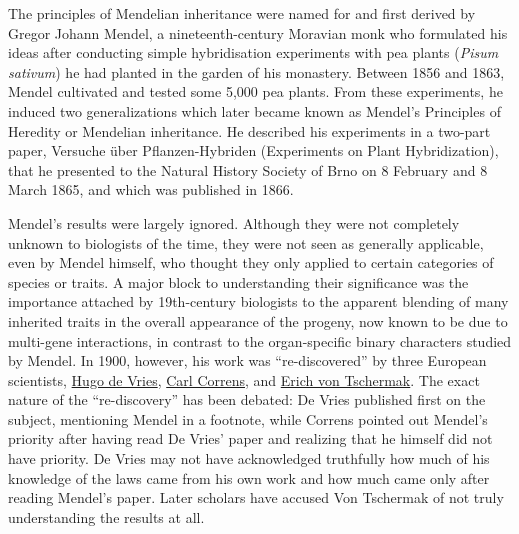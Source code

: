 The principles of Mendelian inheritance were named for and first derived by Gregor Johann Mendel, a nineteenth-century Moravian monk who formulated his ideas after conducting simple hybridisation experiments with pea plants (\emph{Pisum sativum}) he had planted in the garden of his monastery. Between 1856 and 1863, Mendel cultivated and tested some 5,000 pea plants. From these experiments, he induced two generalizations which later became known as Mendel's Principles of Heredity or Mendelian inheritance. He described his experiments in a two-part paper, Versuche über Pflanzen-Hybriden (Experiments on Plant Hybridization), that he presented to the Natural History Society of Brno on 8 February and 8 March 1865, and which was published in 1866.

Mendel's results were largely ignored. Although they were not completely unknown to biologists of the time, they were not seen as generally applicable, even by Mendel himself, who thought they only applied to certain categories of species or traits. A major block to understanding their significance was the importance attached by 19th-century biologists to the apparent blending of many inherited traits in the overall appearance of the progeny, now known to be due to multi-gene interactions, in contrast to the organ-specific binary characters studied by Mendel. In 1900, however, his work was ``re-discovered'' by three European scientists, \href{https://en.wikipedia.org/wiki/Hugo_de_Vries}{Hugo de Vries}, \href{https://en.wikipedia.org/wiki/Carl_Correns}{Carl Correns}, and \href{https://en.wikipedia.org/wiki/Erich_von_Tschermak}{Erich von Tschermak}. The exact nature of the ``re-discovery'' has been debated: De Vries published first on the subject, mentioning Mendel in a footnote, while Correns pointed out Mendel's priority after having read De Vries' paper and realizing that he himself did not have priority. De Vries may not have acknowledged truthfully how much of his knowledge of the laws came from his own work and how much came only after reading Mendel's paper. Later scholars have accused Von Tschermak of not truly understanding the results at all.

